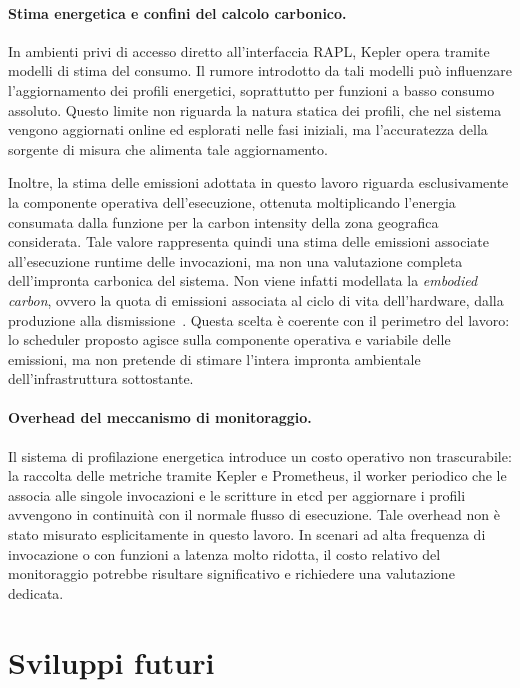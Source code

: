 \paragraph{Stima energetica e confini del calcolo carbonico.}
In ambienti privi di accesso diretto all'interfaccia RAPL, Kepler opera
tramite modelli di stima del consumo. Il rumore introdotto da tali modelli
può influenzare l'aggiornamento dei profili energetici, soprattutto per
funzioni a basso consumo assoluto. Questo limite non riguarda la natura
statica dei profili, che nel sistema vengono aggiornati online ed esplorati
nelle fasi iniziali, ma l'accuratezza della sorgente di misura che alimenta
tale aggiornamento.

Inoltre, la stima delle emissioni adottata in questo lavoro riguarda
esclusivamente la componente operativa dell'esecuzione, ottenuta
moltiplicando l'energia consumata dalla funzione per la carbon intensity
della zona geografica considerata. Tale valore rappresenta quindi una
stima delle emissioni associate all'esecuzione runtime delle invocazioni,
ma non una valutazione completa dell'impronta carbonica del sistema.
Non viene infatti modellata la \emph{embodied carbon}, ovvero la quota di
emissioni associata al ciclo di vita dell'hardware, dalla produzione alla
dismissione~\cite{gupta2021chasingcarbon}. Questa scelta è coerente con
il perimetro del lavoro: lo scheduler proposto agisce sulla componente
operativa e variabile delle emissioni, ma non pretende di stimare l'intera
impronta ambientale dell'infrastruttura sottostante.

\paragraph{Overhead del meccanismo di monitoraggio.}
Il sistema di profilazione energetica introduce un costo operativo non
trascurabile: la raccolta delle metriche tramite Kepler e Prometheus, il
worker periodico che le associa alle singole invocazioni e le scritture in
etcd per aggiornare i profili avvengono in continuità con il normale flusso
di esecuzione. Tale overhead non è stato misurato esplicitamente in questo
lavoro. In scenari ad alta frequenza di invocazione o con funzioni a latenza
molto ridotta, il costo relativo del monitoraggio potrebbe risultare
significativo e richiedere una valutazione dedicata.

\section{Sviluppi futuri}

